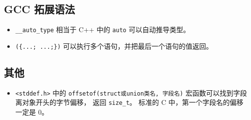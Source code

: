 \subsection{GCC 拓展语法}
\begin{itemize}
\item \verb`__auto_type` 相当于 C++ 中的 \verb`auto` 可以自动推导类型。
\item \verb`({...; ...;})` 可以执行多个语句，并把最后一个语句的值返回。
\end{itemize}

\subsection{其他}
\begin{itemize}
\item \verb`<stddef.h>` 中的 \verb`offsetof(struct或union类名, 字段名)` 宏函数可以找到字段离对象开头的字节偏移， 返回 \verb`size_t`。 标准的 C 中，第一个字段名的偏移一定是 0。
\end{itemize}
